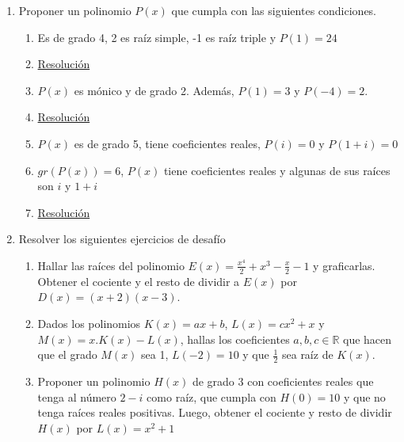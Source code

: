 \documentclass[a4paper]{article}
\newcommand{\answer}{\item[**]}
\newcommand{\exercise}{\item}
\newcommand{\df}[2]{\displaystyle\frac{#1}{#2}}
\begin{document}
\begin{enumerate}
\begin{multicols}{2}
\begin{enumerate} [label=(\alph*)]
		\item $x^6+3x^3-4$
		\answer \href{https://youtu.be/BCo0pxE288w}{Resolución}

	\end{enumerate}
	\end{multicols}

	\exercise Proponer un polinomio $P(x)$ que cumpla con las siguientes condiciones.

	\begin{multicols}{2}
	\begin{enumerate} [label=(\alph*)]
		
		\item Es de grado 4, 2 es raíz simple, -1 es raíz triple y $P(1)=24$
		\answer \href{https://youtu.be/_XVYatmUKBg}{Resolución}

		\item $P(x)$ es mónico y de grado 2. Además, $P(1)=3$ y $P(-4)=2$.
		\answer \href{https://youtu.be/LDpq_f-baPc}{Resolución}

		\item $P(x)$ es de grado 5, tiene coeficientes reales, $P(i)=0$ y $P(1+i)=0$

		\item $gr\left(P(x)\right)=6$, $P(x)$ tiene coeficientes reales y algunas de sus raíces son $i$ y $1+i$
		\answer \href{https://youtu.be/LDpq_f-baPc}{Resolución}


	\end{enumerate}
	\end{multicols}

	\exercise Resolver los siguientes ejercicios de desafío
	\begin{enumerate} [label=(\alph*)]
		
		\item Hallar las raíces del polinomio $E(x)=\df{x^4}{2}+x^3-\df{x}{2}-1$ y graficarlas. Obtener el cociente y el resto de dividir a $E(x)$ por $D(x)=(x+2)(x-3)$.

		\item Dados los polinomios $K(x)=ax+b$, $L(x)=cx^2+x$ y $M(x)=x.K(x)-L(x)$, hallas los coeficientes $a,b,c \in \mathbb{R}$ que hacen que el grado $M(x)$ sea 1, $L(-2)=10$ y que $\df{1}{2}$ sea raíz de $K(x)$.

		\item Proponer un polinomio $H(x)$ de grado 3 con coeficientes reales que tenga al número $2-i$ como raíz, que cumpla con $H(0)=10$ y que no tenga raíces reales positivas. Luego, obtener el cociente y resto de dividir $H(x)$ por $L(x)=x^2+1$


\end{enumerate}
\end{enumerate}
\end{document}
